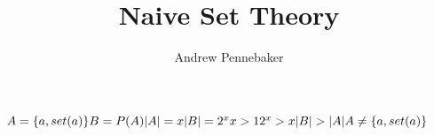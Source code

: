 \documentclass{article}
\title{Naive Set Theory}
\author{Andrew Pennebaker}
\begin{document}
\maketitle

\noindent
$
A = \{ a, set(a) \}
\\\\
B = P(A)
\\\\
|A| = x
\\\\
|B| = 2^x
\\\\
x > 1
\\\\
2^x > x
\\\\
|B| > |A|
\\\\
A \neq \{ a, set(a) \} 
$
\end{document}
